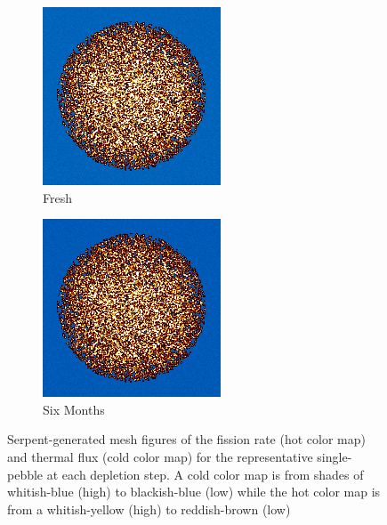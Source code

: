 \begin{figure}[H]
\centering
%
\begin{subfigure}{0.31\textwidth}
  \includegraphics[width=0.9\linewidth]{figures/burn-20-bstep0}
  \caption{Fresh}
  \label{fig:bstep0}
\end{subfigure}%
%
\begin{subfigure}{0.31\textwidth}
  \includegraphics[width=0.9\linewidth]{figures/burn-20-bstep1}
  \caption{Six Months}
  \label{fig:bstep1}
\end{subfigure}%

\caption[Serpent-Generated Mesh Figures of the Fission Rate and Thermal Flux for the Representative Single-Pebble at each Depletion Step]{Serpent-generated mesh figures of the fission rate (hot color map) and thermal flux (cold color map) for the representative single-pebble at each depletion step.  A cold color map is from shades of whitish-blue (high) to blackish-blue (low) while the hot color map is from a whitish-yellow (high) to reddish-brown (low)}
\end{figure}

